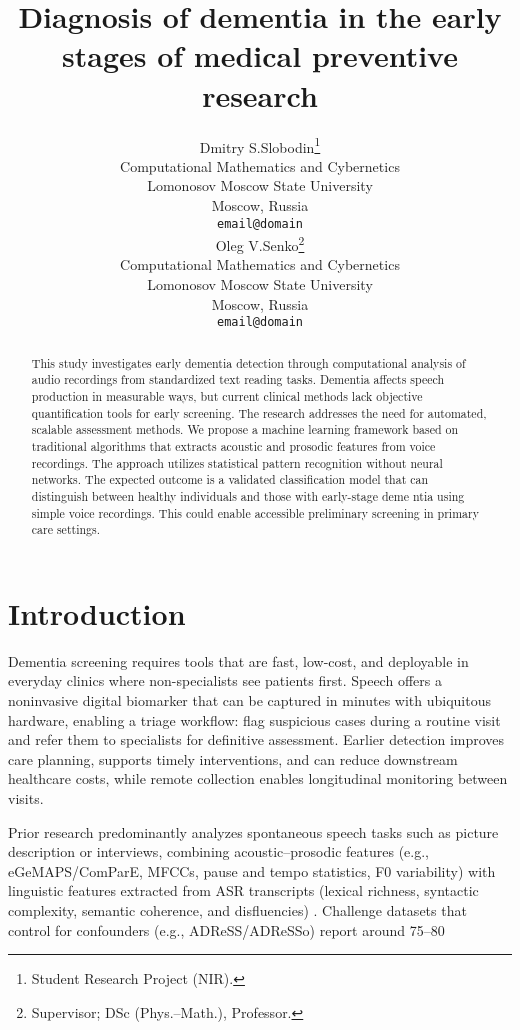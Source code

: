 \documentclass{article}
\title{Diagnosis of dementia in the early stages of medical preventive research}
\author{
    Dmitry S.Slobodin\thanks{Student Research Project (NIR).}\\
    Computational Mathematics and Cybernetics\\
    Lomonosov Moscow State University\\
    Moscow, Russia\\
    \texttt{email@domain}\\
    \And
    Oleg V.Senko\thanks{Supervisor; DSc (Phys.–Math.), Professor.}\\
    Computational Mathematics and Cybernetics\\
    Lomonosov Moscow State University\\
    Moscow, Russia\\
    \texttt{email@domain}\\
}
\date{}
\begin{document}
\maketitle

\begin{abstract}
This study investigates early dementia detection through computational analysis of audio recordings from standardized text reading tasks. Dementia affects speech production in measurable ways, but current clinical methods lack objective quantification tools for early screening. The research addresses the need for automated, scalable assessment methods. We propose a machine learning framework based on traditional algorithms that extracts acoustic and prosodic features from voice recordings. The approach utilizes statistical pattern recognition without neural networks. The expected outcome is a validated classification model that can distinguish between healthy individuals and those with early-stage deme ntia using simple voice recordings. This could enable accessible preliminary screening in primary care settings.
\end{abstract}



\section{Introduction}
Dementia screening requires tools that are fast, low-cost, and deployable in everyday clinics where non-specialists see patients first. Speech offers a noninvasive digital biomarker that can be captured in minutes with ubiquitous hardware, enabling a triage workflow: flag suspicious cases during a routine visit and refer them to specialists for definitive assessment. Earlier detection improves care planning, supports timely interventions, and can reduce downstream healthcare costs, while remote collection enables longitudinal monitoring between visits.

Prior research predominantly analyzes spontaneous speech tasks such as picture description or interviews, combining acoustic–prosodic features (e.g., eGeMAPS/ComParE, MFCCs, pause and tempo statistics, F0 variability) with linguistic features extracted from ASR transcripts (lexical richness, syntactic complexity, semantic coherence, and disfluencies) \citep{adress2020,adresso2021,review2020,fraser2016,karlekar2018,warnita2018,gemaps2015}. Challenge datasets that control for confounders (e.g., ADReSS/ADReSSo) report around 75–80%
\end{document}
